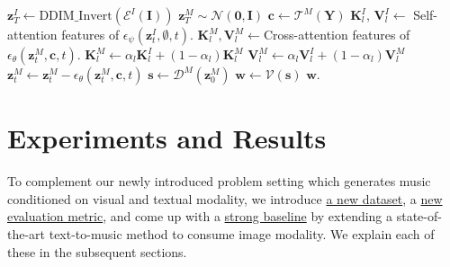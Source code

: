\begin{algorithm}[!t]
\small
\caption{\modelname: Sampling}
\label{algo:sampling}
\begin{algorithmic}[1]
\State $\bm{z}^{I}_{T} \leftarrow \text{DDIM\_Invert}(\mathcal{E}^I(\bm{I}))$ 
\State $\bm{z}^{M}_{T} \sim \mathcal{N}(\bm{0}, \textbf{I})$ 
\State $\bm{c} \leftarrow \mathcal{T}^M(\bm{Y})$ 
 
\State $\bm{K}^I_l$, $\bm{V}^I_l \leftarrow$ Self-attention features of $\epsilon_\psi(\bm{z}^{I}_{t},\emptyset, t)$.
\State $\bm{K}^M_l,\bm{V}^M_l\leftarrow$Cross-attention features of $\epsilon_\theta(\bm{z}^{M}_{t},\bm{c},t)$.
\State $\bm{K}^M_l \leftarrow \alpha_l \bm{K}^I_l + (1 - \alpha_l) \bm{K}^M_l$  
\State $\bm{V}^M_l \leftarrow \alpha_l \bm{V}^I_l + (1 - \alpha_l) \bm{V}^M_l$  
\EndFor
\State $\bm{z}^{M}_{t} \leftarrow \bm{z}^{M}_{t} - \epsilon_\theta(\bm{z}^{M}_{t},\bm{c},t)$ 
\EndFor
\State $\bm{s} \leftarrow \mathcal{D}^M(\bm{z}^{M}_{0})$ 
\State $\bm{w} \leftarrow \mathcal{V}(\bm{s})$ 
\State \Return $\bm{w}$.
\end{algorithmic}
\end{algorithm}

\section{Experiments and Results}
\label{experiments_and_results}
To complement our newly introduced problem setting which generates music conditioned on visual and textual modality, we introduce \underline{a new dataset}, a \underline{new evaluation metric}, and come up with a \underline{strong baseline} by extending a state-of-the-art text-to-music method to consume image modality. We explain each of these in the subsequent sections.

